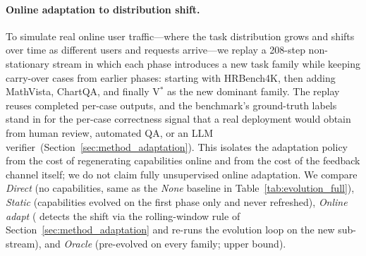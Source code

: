 


\paragraph{Online adaptation to distribution shift.}
To simulate real online user traffic---where the task distribution grows and shifts over
time as different users and requests arrive---we replay a 208-step non-stationary stream
in which each phase introduces a new task family while keeping carry-over cases from
earlier phases: starting with HRBench4K, then adding MathVista, ChartQA, and finally V$^*$
as the new dominant family. The replay reuses completed per-case outputs, and the
benchmark's ground-truth labels stand in for the per-case correctness signal that a
real deployment would obtain from human review, automated QA, or an LLM
verifier~(Section~\ref{sec:method_adaptation}). This isolates the adaptation policy from
the cost of regenerating capabilities online and from the cost of the feedback channel
itself; we do not claim fully unsupervised online adaptation. We compare \emph{Direct} (no capabilities, same as the \emph{None} baseline in
Table~\ref{tab:evolution_full}), \emph{Static} (capabilities evolved on the first phase
only and never refreshed), \emph{Online adapt} (\sysname{} detects the shift via the
rolling-window rule of Section~\ref{sec:method_adaptation} and re-runs the evolution loop
on the new sub-stream), and \emph{Oracle} (pre-evolved on every family; upper bound).

